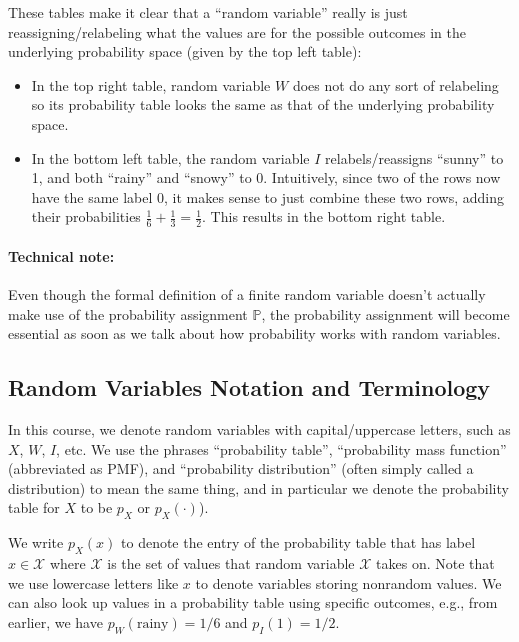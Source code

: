 \documentclass[6008notes.tex]{subfiles}
\begin{document}
These tables make it clear that a ``random variable'' really is just reassigning/relabeling what the values are for the possible outcomes in the underlying probability space (given by the top left table):

\begin{itemize}
\item In the top right table, random variable $W$ does not do any sort of relabeling so its probability table looks the same as that of the underlying probability space.

\item In the bottom left table, the random variable $I$ relabels/reassigns ``sunny'' to 1, and both ``rainy'' and ``snowy'' to 0. Intuitively, since two of the rows now have the same label 0, it makes sense to just combine these two rows, adding their probabilities $\frac{1}{6}+\frac{1}{3}=\frac{1}{2}$. This results in the bottom right table.
\end{itemize}

\paragraph{Technical note:} Even though the formal definition of a finite random variable doesn't actually make use of the probability assignment $\mathbb {P}$, the probability assignment will become essential as soon as we talk about how probability works with random variables.

\subsection{Random Variables Notation and Terminology}

In this course, we denote random variables with capital/uppercase letters, such as $X$, $W$, $I$, etc. We use the phrases ``probability table'', ``probability mass function'' (abbreviated as PMF), and ``probability distribution'' (often simply called a distribution) to mean the same thing, and in particular we denote the probability table for $X$ to be $p_ X$ or $p_ X(\cdot )$).

We write $p_ X(x)$ to denote the entry of the probability table that has label $x \in \mathcal{X}$ where $\mathcal{X}$ is the set of values that random variable $\mathcal{X}$ takes on. Note that we use lowercase letters like $x$ to denote variables storing nonrandom values. We can also look up values in a probability table using specific outcomes, e.g., from earlier, we have $p_ W(\text {rainy}) = 1/6$ and $p_ I(1)=1/2$.
\end{document}
